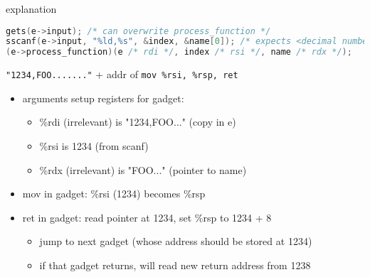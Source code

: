 \iftoggle{heldback}{\excludecomment{soln}}{\includecomment{soln}}
\begin{soln}
\begin{frame}[fragile,label=useFPtrOverwrite1Explain]{explanation}
\begin{lstlisting}[language=C++,style=script]
gets(e->input); /* can overwrite process_function */
sscanf(e->input, "%ld,%s", &index, &name[0]); /* expects <decimal number>,<string> */
(e->process_function)(e /* rdi */, index /* rsi */, name /* rdx */);
\end{lstlisting}
\texttt{"1234,FOO......."} + addr of \texttt{mov \%rsi, \%rsp, ret}
\begin{itemize}
\item arguments setup registers for gadget:
\begin{itemize}
    \item \%rdi (irrelevant) is "1234,FOO..." (copy in e)
    \item \%rsi is 1234 (from scanf)
    \item \%rdx (irrelevant) is "FOO..." (pointer to name)
\end{itemize}
\item mov in gadget: \%rsi (1234) becomes \%rsp
\item ret in gadget: read pointer at 1234, set \%rsp to 1234 + 8
    \begin{itemize}
    \item jump to next gadget (whose address should be stored at 1234)
    \item if that gadget returns, will read new return address from 1238
    \end{itemize}
\end{itemize}
\end{frame}
\end{soln}


